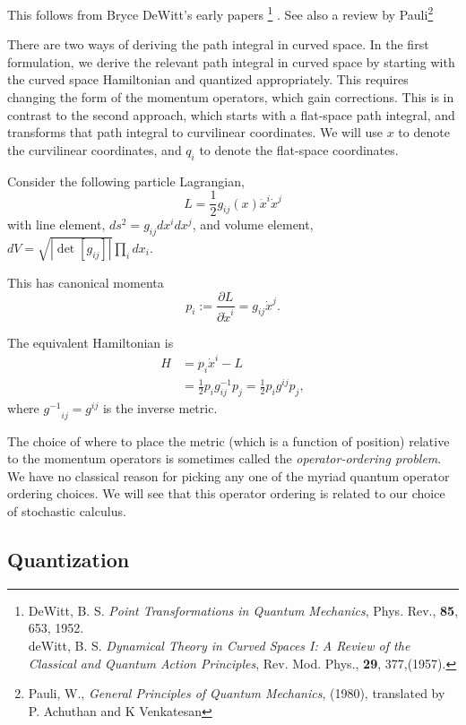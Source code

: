 This follows from Bryce DeWitt's early papers \footnote{
DeWitt, B. S. \textit{Point Transformations in Quantum Mechanics}, 
{Phys. Rev.}, \textbf{85}, 653, 1952.\\
deWitt, B. S. \textit{Dynamical Theory in Curved Spaces I: A Review of the 
Classical and Quantum Action Principles}, {Rev. Mod. Phys.}, \textbf{29}, 377,(1957). } .
See also a review by Pauli\footnote{
Pauli, W., \textit{General Principles of Quantum Mechanics}, (1980), 
translated by P. Achuthan and K Venkatesan} 

There are two ways of deriving the path integral in curved space.  In the first 
formulation, we derive the relevant path integral in curved space
by starting with the curved space Hamiltonian and quantized appropriately.  
This requires changing the form of the momentum operators, which gain corrections.
This is in contrast to the second approach, which starts with a flat-space path
 integral, and transforms that path integral to curvilinear coordinates.
 We will use $x$ to denote the curvilinear coordinates, and $q_i$ to denote the flat-space coordinates.  

Consider the following particle Lagrangian,
\begin{equation}
L = \frac{1}{2}g_{ij}(x)\dot{x}^i\dot{x}^j
\end{equation}
with line element, $ds^2 = g_{ij} dx^i dx^j$, and volume element, 
$dV = \sqrt{|\det[g_{ij}]|}\prod_idx_i$.  

This has canonical momenta 
\begin{equation}
p_i := \frac{\partial L}{\partial \dot{x}^i} = g_{ij}\dot{x}^j.
\end{equation}

The equivalent Hamiltonian is 
\begin{align}
H & = p_i\dot{x}^i - L \\
& = \frac{1}{2} p_i g^{-1}_{ij}p_j = \frac{1}{2}p_i g^{ij}p_j,
\end{align}
where  ${g^{-1}}_{ij} = g^{ij}$ is the inverse metric.  

The choice of where to place the metric (which is a function of position)
 relative to the momentum operators is sometimes called the 
\textit{operator-ordering problem}.  We have no classical reason for picking
any one of the myriad quantum operator ordering choices.  
We will see that this operator ordering is related to our choice of stochastic calculus.  

\subsection{Quantization}


